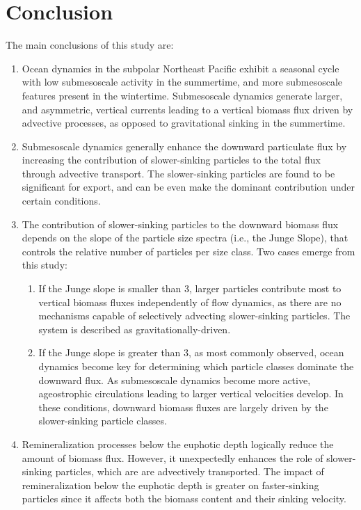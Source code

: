 \documentclass[article,linenumbers]{agujournal2019}
\begin{document}
	\section{Conclusion}
	\label{sec: Conclusions}
	The main conclusions of this study are:
	\begin{enumerate}
		\item Ocean dynamics in the subpolar Northeast Pacific exhibit a seasonal cycle with low submesoscale activity in the summertime, and more submesoscale features present in the wintertime. Submesoscale dynamics generate larger, and asymmetric, vertical currents leading to a vertical biomass flux driven by advective processes, as opposed to gravitational sinking in the summertime.

		\item Submesoscale dynamics generally enhance the downward particulate flux by increasing the contribution of slower-sinking particles to the total flux through advective transport. The  slower-sinking particles are found to be significant for export, and can be even make the dominant contribution under certain conditions.
		\item The contribution of slower-sinking particles to the downward biomass flux depends on the slope of the particle size spectra (i.e., the Junge Slope), that controls the relative number of particles per size class. Two cases emerge from this study:
		\begin{enumerate}
			\item If the Junge slope is smaller than 3, larger particles contribute most to vertical biomass fluxes independently of flow dynamics, as there are no mechanisms capable of selectively advecting slower-sinking particles. The system is described as gravitationally-driven.
			\item If the Junge slope is greater than 3, as most commonly observed, ocean dynamics become key for determining which particle classes dominate the downward flux. As submesoscale dynamics become more active, ageostrophic circulations leading to larger vertical velocities develop. In these conditions, downward biomass fluxes are largely driven by the slower-sinking particle classes.
		\end{enumerate}
		\item Remineralization processes below the euphotic depth logically reduce the amount of biomass flux. However, it unexpectedly enhances the role of slower-sinking particles, which are are advectively transported. The impact of remineralization below the euphotic depth is greater on faster-sinking particles since it affects both the biomass content and their sinking velocity.
	\end{enumerate}
\end{document}
